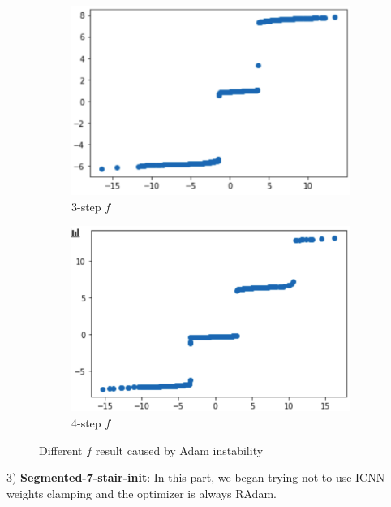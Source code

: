 \documentclass[conference,compsoc]{IEEEtran}
\begin{document}
  \begin{figure}
    \centering
        \begin{subfigure}[b]{0.2\textwidth}            
                \includegraphics[width=\textwidth]{images/3-step-Adam.png}
                \caption{3-step $f$}
                \label{fig:3-step f}
        \end{subfigure}%
        \begin{subfigure}[b]{0.2\textwidth}
                \centering
                \includegraphics[width=\textwidth]{images/4-step-Adam.png}
                \caption{4-step $f$}
                \label{fig:4-step f}
        \end{subfigure}
        \caption{Different $f$ result caused by Adam instability}\label{fig:Different $f$ result caused by Adam instability}
    \end{figure}
3) \textbf{Segmented-7-stair-init}:
  In this part, we began trying not to use ICNN weights clamping and the optimizer is always RAdam. 
\end{document}

